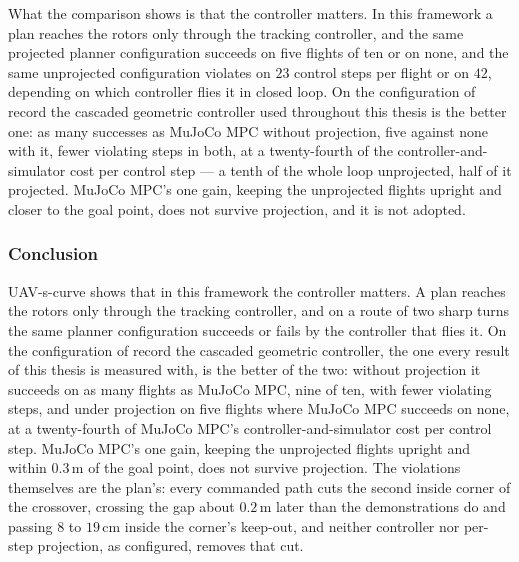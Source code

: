 What the comparison shows is that the controller matters. In this framework a plan reaches the rotors only
through the tracking controller, and the same projected planner configuration succeeds on five flights of ten or on none, and
the same unprojected configuration violates on $23$ control steps per flight or on $42$, depending on which
controller flies it in closed loop. On the configuration of record the cascaded geometric controller used throughout this thesis is
the better one: as many successes as MuJoCo MPC without projection, five against none with it, fewer violating
steps in both, at a twenty-fourth of the controller-and-simulator cost per control step --- a tenth of the whole loop
unprojected, half of it projected. MuJoCo MPC's one gain, keeping the unprojected
flights upright and closer to the goal point, does not survive projection, and it is not adopted.

\FloatBarrier
\subsubsection{Conclusion}\label{sec:res:uav:scurve:conclusion}

UAV-s-curve shows that in this framework the controller matters. A plan reaches the rotors only through the
tracking controller, and on a route of two sharp turns the same planner configuration succeeds or fails by the controller that
flies it. On the configuration of record the cascaded geometric controller, the one every result of this
thesis is measured with, is the better of the two: without projection it succeeds on as many flights as
MuJoCo MPC, nine of ten, with fewer violating steps, and under projection on five flights where MuJoCo MPC
succeeds on none, at a twenty-fourth of MuJoCo MPC's controller-and-simulator cost per control step. MuJoCo MPC's one gain,
keeping
the unprojected flights upright and within $0.3$\,m of the goal point, does not survive projection. The
violations themselves are the plan's: every commanded path cuts the second inside corner of the crossover,
crossing the gap about $0.2$\,m later than the demonstrations do and passing $8$ to $19$\,cm inside the
corner's keep-out, and neither controller nor per-step projection, as configured, removes that cut.

